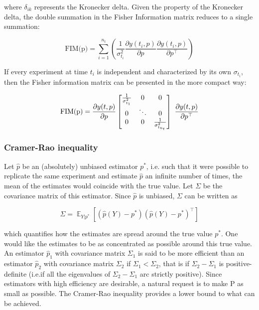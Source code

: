 \documentclass[../Article_Design_of_Experiment.tex]{subfiles}
\begin{document}
	where $\delta_{ik}$ represents the Kronecker delta. Given the property of the Kronecker delta, the double summation in the Fisher Information matrix reduces to a single summation:
	
	{\footnotesize
	\begin{equation}
		\text{FIM(p)} = \sum_{i=1}^{n_t} \left( \frac{1}{\sigma_{t_i}^2} \frac{\partial y(t_i, p)}{\partial p} \frac{\partial y(t_i, p)}{\partial p^\top} \right)
	\end{equation} }
	
	If every experiment at time $t_i$ is independent and characterized by its own $\sigma_{t_i}$, then the Fisher information matrix can be presented in the more compact way:
	
	{\footnotesize
	\begin{equation}
		\text{\text{FIM(p)}} = \frac{\partial y(t, p)}{\partial p} \begin{bmatrix}
			\frac{1}{\sigma_{t_1}^2} & 0 & 0\\
			0 & \ddots & 0 \\
			0 & 0 & \frac{1}{\sigma_{t_{n_t}}^2} 
		\end{bmatrix}\ \frac{\partial y(t, p)}{\partial p^\top} 
	\end{equation} }
	
	\subsubsection{Cramer-Rao inequality}
	
	Let $\hat{p}$ be an (absolutely) unbiased estimator $p^*$, i.e. such that it were possible to replicate the same experiment and estimate $\hat{p}$ an infinite number of times, the mean of the estimates would coincide with the true value. Let $\Sigma$ be the covariance matrix of this estimator. Since $\hat{p}$ is unbiased, $\Sigma$ can be written as
	
	{\footnotesize
	\begin{equation}
		\Sigma = \mathop{\mathbb{E}}_{Y|p^*} \left[ \left( \hat{p}(Y) - p^* \right) \left( \hat{p}(Y) - p^* \right)^\top \right]
	\end{equation} }
	
	which quantifies how the estimates are spread around the true value $p^*$. One would like the estimates to be as concentrated as possible around this true value. An estimator $\hat{p}_1$ with covariance matrix $\Sigma_1$ is said to be more efficient than an estimator $\hat{p}_2$ with covariance matrix $\Sigma_2$ if $\Sigma_1 < \Sigma_2$, that is if $\Sigma_2 - \Sigma_1$ is positive-definite (i.e.if all the eigenvalues of $\Sigma_2-\Sigma_1$ arc strictly positive). Since estimators with high efficiency are desirable, a natural request is to make P as small as possible. The Cramer-Rao inequality provides a lower bound to what can be achieved.
	
\end{document}
